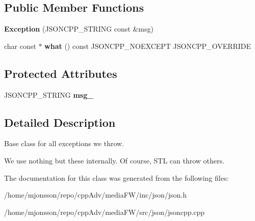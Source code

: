 \subsection*{Public Member Functions}
\begin{DoxyCompactItemize}
\item 
\mbox{\label{classJson_1_1Exception_ae764aa42e0755bd4ce9d303e2733fa8f}} 
{\bfseries Exception} (J\+S\+O\+N\+C\+P\+P\+\_\+\+S\+T\+R\+I\+NG const \&msg)
\item 
\mbox{\label{classJson_1_1Exception_a70b7ce35e761fb93e8cd338e04619cd6}} 
char const  $\ast$ {\bfseries what} () const J\+S\+O\+N\+C\+P\+P\+\_\+\+N\+O\+E\+X\+C\+E\+PT J\+S\+O\+N\+C\+P\+P\+\_\+\+O\+V\+E\+R\+R\+I\+DE
\end{DoxyCompactItemize}
\subsection*{Protected Attributes}
\begin{DoxyCompactItemize}
\item 
\mbox{\label{classJson_1_1Exception_aae3cbb8b45bf21480f64502a8329659f}} 
J\+S\+O\+N\+C\+P\+P\+\_\+\+S\+T\+R\+I\+NG {\bfseries msg\+\_\+}
\end{DoxyCompactItemize}


\subsection{Detailed Description}
Base class for all exceptions we throw.

We use nothing but these internally. Of course, S\+TL can throw others. 

The documentation for this class was generated from the following files\+:\begin{DoxyCompactItemize}
\item 
/home/mjonsson/repo/cpp\+Adv/media\+F\+W/inc/json/json.\+h\item 
/home/mjonsson/repo/cpp\+Adv/media\+F\+W/src/json/jsoncpp.\+cpp\end{DoxyCompactItemize}
